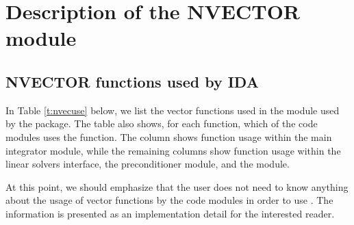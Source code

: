 \chapter{Description of the NVECTOR module}\label{s:nvector}



\section{NVECTOR functions used by IDA}

In Table \ref{t:nvecuse} below, we list the vector functions used in the 
{\nvector} module used by the {\ida} package.
The table also shows, for each function, which of the code modules uses
the function. The {\ida} column shows function usage within the main
integrator module, while the remaining columns show function usage
within the {\idals} linear solvers interface, the {\idabbdpre}
preconditioner module, and the {\fida} module.  

At this point, we should emphasize that the {\ida} user does not need to know 
anything about the usage of vector functions by the {\ida} code modules in order 
to use {\ida}. The information is presented as an implementation detail for the 
interested reader.

